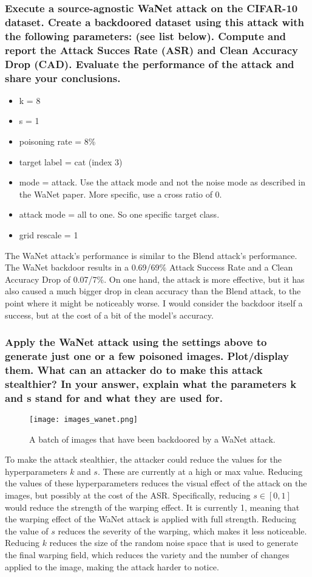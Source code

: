 \documentclass{article}
\begin{document}
\subsubsection{Execute a source-agnostic WaNet attack on the CIFAR-10 dataset.
Create a backdoored dataset using this attack with the following parameters: (see list below).
Compute and report the Attack Succes Rate (ASR) and Clean Accuracy Drop
(CAD). Evaluate the performance of the attack and share your conclusions.}
\begin{itemize}
    \item k = 8
    \item s = 1
    \item poisoning rate = 8\%
    \item target label = cat (index 3)
    \item mode = attack. Use the attack mode and not the noise mode as described in the WaNet paper. More specific, use a cross ratio of 0.
    \item attack mode = all to one. So one specific target class.
    \item grid rescale = 1
\end{itemize}

The WaNet attack's performance is similar to the Blend attack's performance. 
The WaNet backdoor results in a 0.69/69\% Attack Success Rate and a Clean Accuracy Drop of 0.07/7\%. 
On one hand, the attack is more effective, but it has also caused a much bigger drop in clean accuracy than the Blend attack, to the point where it might be noticeably worse. 
I would consider the backdoor itself a success, but at the cost of a bit of the model's accuracy.

\subsubsection{Apply the WaNet attack using the settings above to generate just one
or a few poisoned images. Plot/display them. What can an attacker do to make
this attack stealthier? In your answer, explain what the parameters k and s
stand for and what they are used for.}
\begin{figure}[h]
    \centering
    \texttt{[image: images\_wanet.png]}
    \caption{A batch of images that have been backdoored by a WaNet attack.}
    \label{fig:images_wanet}
\end{figure}

To make the attack stealthier, the attacker could reduce the values for the hyperparameters $k$ and $s$. 
These are currently at a high or max value. 
Reducing the values of these hyperparameters reduces the visual effect of the attack on the images, but possibly at the cost of the ASR. 
Specifically, reducing $s \in [0, 1]$ would reduce the strength of the warping effect. 
It is currently 1, meaning that the warping effect of the WaNet attack is applied with full strength. 
Reducing the value of $s$ reduces the severity of the warping, which makes it less noticeable. 
Reducing $k$ reduces the size of the random noise space that is used to generate the final warping field, which reduces the variety and the number of changes applied to the image, making the attack harder to notice.
\end{document}
